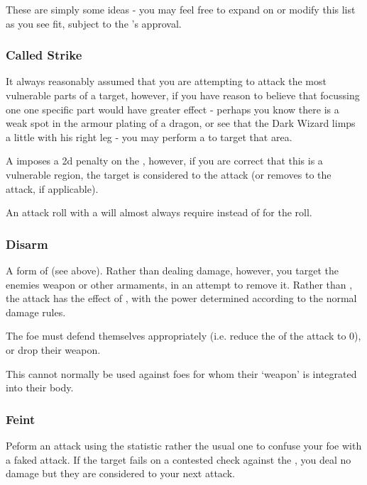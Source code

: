 These are simply some ideas - you may feel free to expand on or modify this list as you see fit, subject to the 's approval.

\subsubsection{Called Strike}

It always reasonably assumed that you are attempting to attack the most vulnerable parts of a target, however, if you have reason to believe that focussing one one specific part would have greater effect - perhaps you know there is a weak spot in the armour plating of a dragon, or see that the Dark Wizard limps a little with his right leg - you may perform a  to target that area.

A  imposes a 2d penalty on the , however, if you are correct that this is a vulnerable region, the target is considered  to the attack (or removes  to the attack, if applicable).

An attack roll with a  will almost always require  instead of  for the roll. 

\subsubsection{Disarm}

A form of  (see above). Rather than dealing damage, however, you target the enemies weapon or other armaments, in an attempt to remove it. Rather than , the attack has the effect of , with the power determined according to the normal damage rules. 

The foe must defend themselves appropriately (i.e. reduce the  of the attack to 0), or drop their weapon. 

This cannot normally be used against foes for whom their `weapon' is integrated into their body. 

\subsubsection{Feint}

Peform an attack using the  statistic rather the usual one to confuse your foe with a faked attack. If the target fails on a contested  check against the , you deal no damage but they are considered  to your next attack.  

